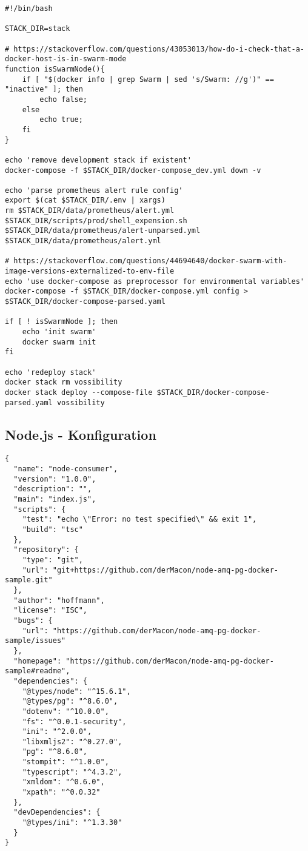\begin{lstlisting}[style=bashStyle,caption={start-stack-services.sh},label=lst:start-stack-services]
#!/bin/bash

STACK_DIR=stack

# https://stackoverflow.com/questions/43053013/how-do-i-check-that-a-docker-host-is-in-swarm-mode
function isSwarmNode(){
    if [ "$(docker info | grep Swarm | sed 's/Swarm: //g')" == "inactive" ]; then
        echo false;
    else
        echo true;
    fi
}

echo 'remove development stack if existent'
docker-compose -f $STACK_DIR/docker-compose_dev.yml down -v

echo 'parse prometheus alert rule config'
export $(cat $STACK_DIR/.env | xargs)
rm $STACK_DIR/data/prometheus/alert.yml
$STACK_DIR/scripts/prod/shell_expension.sh $STACK_DIR/data/prometheus/alert-unparsed.yml $STACK_DIR/data/prometheus/alert.yml

# https://stackoverflow.com/questions/44694640/docker-swarm-with-image-versions-externalized-to-env-file
echo 'use docker-compose as preprocessor for environmental variables'
docker-compose -f $STACK_DIR/docker-compose.yml config > $STACK_DIR/docker-compose-parsed.yaml

if [ ! isSwarmNode ]; then
	echo 'init swarm'
	docker swarm init
fi

echo 'redeploy stack'
docker stack rm vossibility
docker stack deploy --compose-file $STACK_DIR/docker-compose-parsed.yaml vossibility

\end{lstlisting}




\subsection{Node.js - Konfiguration}

\begin{lstlisting}[style=javaStyle,caption={Typescript - package.json},label=anh:package]
{
  "name": "node-consumer",
  "version": "1.0.0",
  "description": "",
  "main": "index.js",
  "scripts": {
    "test": "echo \"Error: no test specified\" && exit 1",
    "build": "tsc"
  },
  "repository": {
    "type": "git",
    "url": "git+https://github.com/derMacon/node-amq-pg-docker-sample.git"
  },
  "author": "hoffmann",
  "license": "ISC",
  "bugs": {
    "url": "https://github.com/derMacon/node-amq-pg-docker-sample/issues"
  },
  "homepage": "https://github.com/derMacon/node-amq-pg-docker-sample#readme",
  "dependencies": {
    "@types/node": "^15.6.1",
    "@types/pg": "^8.6.0",
    "dotenv": "^10.0.0",
    "fs": "^0.0.1-security",
    "ini": "^2.0.0",
    "libxmljs2": "^0.27.0",
    "pg": "^8.6.0",
    "stompit": "^1.0.0",
    "typescript": "^4.3.2",
    "xmldom": "^0.6.0",
    "xpath": "^0.0.32"
  },
  "devDependencies": {
    "@types/ini": "^1.3.30"
  }
}
\end{lstlisting}